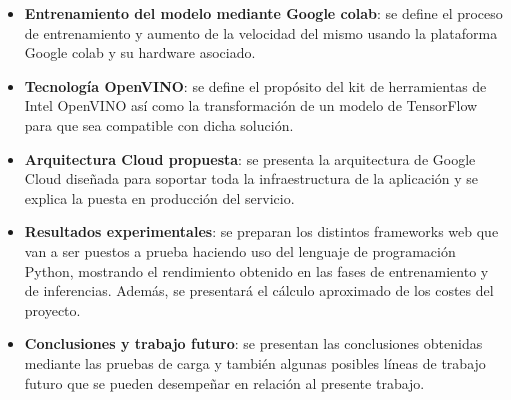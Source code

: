 \begin{itemize}
    \item \textbf{Entrenamiento del modelo mediante Google colab}: se define el proceso de entrenamiento y aumento de la velocidad del mismo usando la plataforma Google colab y su hardware asociado.
    \item \textbf{Tecnología OpenVINO}: se define el propósito del kit de herramientas de Intel OpenVINO así como la transformación de un modelo de TensorFlow para que sea compatible con dicha solución.
    \item \textbf{Arquitectura Cloud propuesta}: se presenta la arquitectura de Google Cloud diseñada para soportar toda la infraestructura de la aplicación y se explica la puesta en producción del servicio.
    \item \textbf{Resultados experimentales}: se preparan los distintos frameworks web que van a ser puestos a prueba haciendo uso del lenguaje de programación Python, mostrando el rendimiento obtenido en las fases de entrenamiento y de inferencias. Además, se presentará el cálculo aproximado de los costes del proyecto.
    \item \textbf{Conclusiones y trabajo futuro}: se presentan las conclusiones obtenidas mediante las pruebas de carga y también algunas posibles líneas de trabajo futuro que se pueden desempeñar en relación al presente trabajo.
\end{itemize}